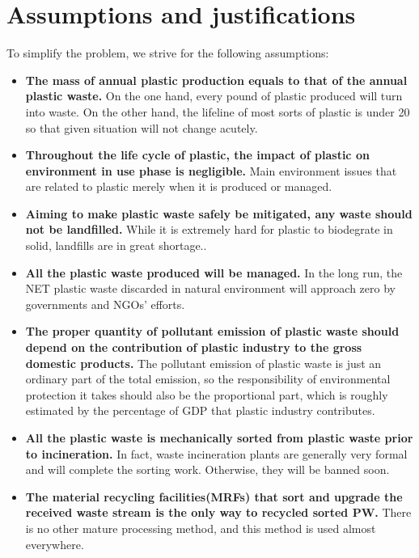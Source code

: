 \documentclass{mcmthesis}
\begin{document}
\section{Assumptions and justifications}

To simplify the problem, we strive for the following assumptions:

\begin{itemize}
	
	\item \textbf{The mass of annual plastic production equals to that of the annual plastic waste.} On the one hand, every pound of plastic produced will turn into waste. On the other hand, the lifeline of most sorts of plastic is under 20 so that given situation will not change acutely\cite{Geyer}.
	
	\item \textbf{Throughout the life cycle of plastic, the impact of plastic on environment in use phase is negligible.} Main environment issues that are related to plastic merely when it is produced or managed\cite{book}.
	
	\item \textbf{Aiming to make plastic waste safely be mitigated, any waste should not be landfilled.} While it is extremely hard for plastic to biodegrate in solid, landfills are in great shortage.\cite{book}.
	
	\item \textbf{All the plastic waste produced will be managed.} In the long run, the NET plastic waste discarded in natural environment will approach zero by governments and NGOs’ efforts.
	
	\item \textbf{The proper quantity of pollutant emission of plastic waste should depend on the contribution of plastic industry to the gross domestic products.} The pollutant emission of plastic waste is just an ordinary part of the total emission, so the responsibility of environmental protection it takes should also be the proportional part, which is roughly estimated by the percentage of GDP that plastic industry contributes.
	
	\item \textbf{All the plastic waste is mechanically sorted from plastic waste prior to incineration.} In fact, waste incineration plants are generally very formal and will complete the sorting work. Otherwise, they will be banned soon.
	
	\item \textbf{The material recycling facilities(MRFs) that sort and upgrade the received waste stream is the only way to recycled sorted PW.} There is no other mature processing method, and this method is used almost everywhere.
	
\end{itemize}
\end{document}
